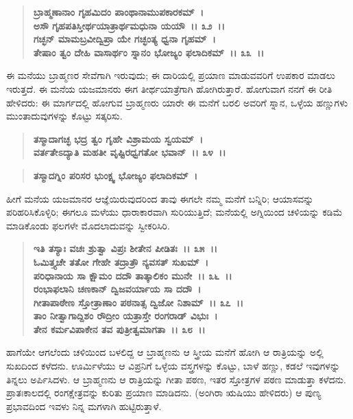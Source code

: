 \begin{verse}
\textbf{ಬ್ರಾಹ್ಮಣಾನಾಂ ಗೃಹಮಿದಂ ಪಾಂಥಾನಾಮುಪಕಾರಕಮ್~।}\\\textbf{ಅಸೌ ಗೃಹಪತಿಸ್ತೀರ್ಥಯಾತ್ರಾರ್ಥಮಧುನಾ ಯಯೌ~।। ೩೨~।। }\\\textbf{ಗಚ್ಛನ್ ಮಾಮಬ್ರವೀದ್ವಿಪ್ರಾ ಯೇ ಗಚ್ಛಂತ್ಯ ಧ್ವನಾ ಗೃಹಮ್~।} \\\textbf{ತೇಷಾಂ ತ್ವಂ ದೇಹಿ ವಾಸಾರ್ಥಂ ಸ್ನಾನಂ ಭೋಜ್ಯಂ ಫಲಾದಿಕಮ್~।। ೩೩~।।}
\end{verse}

ಈ ಮನೆಯು ಬ್ರಾಹ್ಮಣರ ಸೇವೆಗಾಗಿ ಇರುವುದು; ಈ ದಾರಿಯಲ್ಲಿ ಪ್ರಯಾಣ ಮಾಡುವವರಿಗೆ ಉಪಕಾರ ಮಾಡಲು ಇರುತ್ತದೆ. ಈ ಮನೆಯ ಯಜಮಾನರು ಈಗ ತೀರ್ಥಯಾತ್ರೆಗಾಗಿ ಹೋಗಿರುತ್ತಾರೆ. ಹೋಗುವಾಗ ನನಗೆ ಈ ರೀತಿ ಹೇಳಿದರು: ಈ ಮಾರ್ಗದಲ್ಲಿ ಹೋಗುವ ಬ್ರಾಹ್ಮಣರು ಯಾರೇ ಈ ಮನೆಗೆ ಬರಲಿ ಅವರಿಗೆ ಸ್ನಾನ, ಒಳ್ಳೆಯ ಹಣ್ಣುಗಳು ಮುಂತಾದುವುಗಳನ್ನು ಕೊಟ್ಟು ಸತ್ಕರಿಸು.

\begin{verse}
\textbf{ತಸ್ಮಾದಾಗಚ್ಛ ಭದ್ರ ತ್ವಂ ಗೃಹೇ ವಿಶ್ರಾಮಯ ಸ್ವಯಮ್~।}\\\textbf{ವರ್ತತೇಽದ್ಯಾತಿ ಮಹತೀ ವೃಷ್ಟಿರಧ್ವಗತೋ ಭವಾನ್~।। ೩೪~।। }
\end{verse}

\begin{verse}
\textbf{ತಸ್ಮಾದಗ್ನಿಂ ಪರಿಸರ ಭುಂಕ್ಷ್ವ ಭೋಜ್ಯಂ ಫಲಾದಿಕಮ್~।}
\end{verse}

ಹೀಗೆ ಮನೆಯ ಯಜಮಾನರ ಆಜ್ಞೆಯಿರುವುದರಿಂದ ತಾವು ಈಗಲೇ ನಮ್ಮ ಮನೆಗೆ ಬನ್ನಿರಿ; ಆಯಾಸವನ್ನು ಪರಿಹರಿಸಿಕೊಳ್ಳಿರಿ; ಈಗಲೂ ಮಳೆಯು ಧಾರಾಕಾರವಾಗಿ ಸುರಿಯು\-ತ್ತಿದೆ; ಮನೆಯಲ್ಲಿ ಅಗ್ನಿಯಿಂದ ಚಳಿಯನ್ನು ಕಡಿಮೆ ಮಾಡಿಕೊಂಡು ಫಲಗಳೇ ಮೊದಲಾದುವನ್ನು ಸ್ವೀಕರಿಸಿರಿ.

\begin{verse}
\textbf{ಇತಿ ತಸ್ಯಾಃ ವಚಃ ಶ್ರುತ್ವಾ ವಿಪ್ರಃ ಶೀತೇನ ಪೀಡಿತಃ~।। ೩೫~।।}\\\textbf{ಓಮಿತ್ತ್ಯಚೇ ತತೋ ಗೇಹೇ ತದ್ರಾತ್ರೌ ನ್ಯವಸತ್ ಸುಖಮ್~। }\\\textbf{ಪರಿಧಾನಾಯ ಸಾ ಕ್ಷೌಮಂ ದದೌ ತಾತ್ಕಾಲಿಕಂ ಮುನೇ~।। ೩೬~।।}\\\textbf{ರಂಭಾಫಲಾನಿ ಚಣಕಾನ್ ದ್ವಿಜವರ್ಯಾಯ ಸಾ ದದೌ~। }\\\textbf{ಗೀತಾಪಾಠೇಣ ಸ್ತೋತ್ರಾಣಾಂ ಪಠನಾತ್ಸ ದ್ವಿಜೋ ನಿಶಾಮ್~।। ೩೭~।।} \\\textbf{ತಾಂ ನೀತ್ವಾಗಾದ್ದಿಶಂ ರೌದ್ರೀಂ ಯತ್ರಾಸ್ತೇ ರಂಗರಾಡ್ ವಿಭುಃ~। }\\\textbf{ತೇನ ಕರ್ಮವಿಪಾಕೇನ ತವ ಪುತ್ರೀತ್ವಮಾಗತಾ~।। ೩೮~।।}
\end{verse}

ಹಾಗೆಯೇ ಆಗಲೆಂದು ಚಳಿಯಿಂದ ಬಳಲಿದ್ದ ಆ ಬ್ರಾಹ್ಮಣನು ಆ ಸ್ತ್ರೀಯ ಮನೆಗೆ ಹೋಗಿ ಆ ರಾತ್ರಿಯನ್ನು ಅಲ್ಲಿ ಸುಖದಿಂದ ಕಳೆದನು. ಊರ್ಮಿಳೆಯು ಆ ವಿಪ್ರನಿಗೆ ಒಳ್ಳೆಯ ವಸ್ತ್ರಗಳನ್ನು ಕೊಟ್ಟು, ಬಾಳೆ ಹಣ್ಣು, ಕಡಲೆ ಇವುಗಳನ್ನು ತಿನ್ನಲು ಅರ್ಪಿಸಿದಳು. ಆ ಬ್ರಾಹ್ಮಣನು ಆ ರಾತ್ರಿಯನ್ನು ಗೀತಾ ಪಠಣ, ಇತರ ಸ್ತೋತ್ರಗಳ ಪಠಣ ಮಾಡುತ್ತಾ ಕಳೆದನು. ಪ್ರಾತಃಕಾಲದಲ್ಲಿ ರಂಗಕ್ಷೇತ್ರವನ್ನು ಕುರಿತು ಪ್ರಯಾಣ ಮಾಡಿದನು. (ಅಂಗಿರಾ ಋಷಿಯು ಹೇಳಿದರು) ಆ ಪುಣ್ಯ ಪ್ರಭಾವದಿಂದ ಇವಳು ನಿನ್ನ ಮಗಳಾಗಿ ಹುಟ್ಟಿರುತ್ತಾಳೆ.

